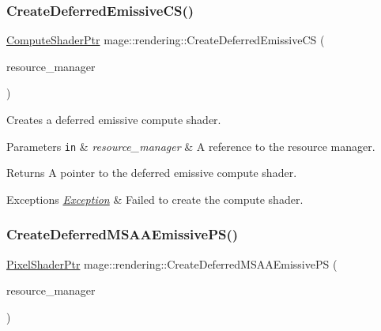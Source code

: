 \subsubsection{\texorpdfstring{Create\+Deferred\+Emissive\+C\+S()}{CreateDeferredEmissiveCS()}}
{\footnotesize\ttfamily \mbox{\hyperlink{namespacemage_1_1rendering_ab3dc9f2114f2e9255b91d9c051da52ea}{Compute\+Shader\+Ptr}} mage\+::rendering\+::\+Create\+Deferred\+Emissive\+CS (\begin{DoxyParamCaption}\item[{\mbox{\hyperlink{classmage_1_1rendering_1_1_resource_manager}{Resource\+Manager}} \&}]{resource\+\_\+manager }\end{DoxyParamCaption})}

Creates a deferred emissive compute shader.


\begin{DoxyParams}[1]{Parameters}
\mbox{\tt in}  & {\em resource\+\_\+manager} & A reference to the resource manager. \\
\hline
\end{DoxyParams}
\begin{DoxyReturn}{Returns}
A pointer to the deferred emissive compute shader. 
\end{DoxyReturn}

\begin{DoxyExceptions}{Exceptions}
{\em \mbox{\hyperlink{classmage_1_1_exception}{Exception}}} & Failed to create the compute shader. \\
\hline
\end{DoxyExceptions}
\mbox{\label{namespacemage_1_1rendering_ade6b1ffe4047baae6cf2743958a2101c}} 
\subsubsection{\texorpdfstring{Create\+Deferred\+M\+S\+A\+A\+Emissive\+P\+S()}{CreateDeferredMSAAEmissivePS()}}
{\footnotesize\ttfamily \mbox{\hyperlink{namespacemage_1_1rendering_af03d922b228ee9c8542baaa2ecc9f259}{Pixel\+Shader\+Ptr}} mage\+::rendering\+::\+Create\+Deferred\+M\+S\+A\+A\+Emissive\+PS (\begin{DoxyParamCaption}\item[{\mbox{\hyperlink{classmage_1_1rendering_1_1_resource_manager}{Resource\+Manager}} \&}]{resource\+\_\+manager }\end{DoxyParamCaption})}


